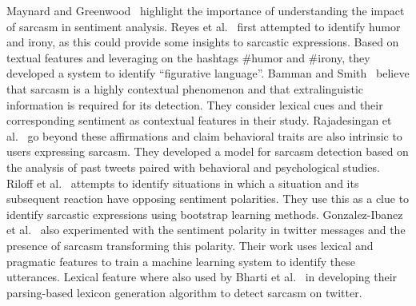 \documentclass[12pt,a4paper]{report}
\theoremstyle{definition}
\begin{document}
\begin{CJK}{UTF8}{bsmi}
\par Maynard and Greenwood~\cite{maynard2014cares}  highlight the importance of
understanding the impact of sarcasm in sentiment analysis.
Reyes et al.~\cite{reyes2012humor}  first attempted to identify humor and irony,
as this could provide some insights to sarcastic expressions.
Based on textual features and leveraging on the hashtags \#humor and \#irony, they developed a system to identify
“figurative language”. Bamman and Smith~\cite{bamman2015contextualized}  believe that
sarcasm is a highly contextual phenomenon and that extralinguistic
information is required for its detection. They
consider lexical cues and their corresponding sentiment as
contextual features in their study. Rajadesingan et al.~\cite{rajadesingan2015sarcasm} 
go beyond these affirmations and claim behavioral traits are
also intrinsic to users expressing sarcasm. They developed
a model for sarcasm detection based on the analysis of past
tweets paired with behavioral and psychological studies.
Riloff et al.~\cite{riloff2013sarcasm} attempts to identify situations in which a situation and its subsequent reaction have opposing sentiment polarities. They use this as a clue to identify sarcastic expressions using bootstrap learning methods. Gonzalez-Ibanez et al.~\cite{gonzalez2011identifying} also experimented with the sentiment polarity in twitter messages and the presence of sarcasm transforming this polarity. Their work uses lexical and pragmatic features to train a machine learning system to identify these utterances. Lexical feature where also used by Bharti et al.~\cite{bharti2015parsing} in developing their  parsing-based lexicon generation algorithm to detect sarcasm on twitter.

\end{CJK}
\end{document}
